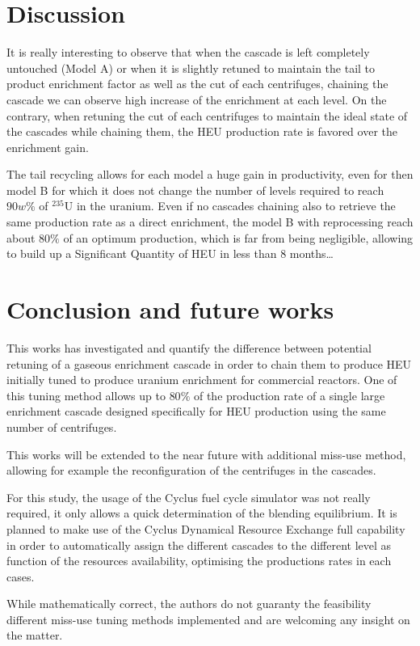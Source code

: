\section{Discussion}

It is really interesting to observe that when the cascade is left completely
untouched (Model A) or when it is slightly retuned to maintain the tail to
product enrichment factor as well as the cut of each centrifuges, chaining the
cascade we can observe high increase of the enrichment at each level.  On the
contrary, when retuning the cut of each centrifuges to maintain the ideal state
of the cascades while chaining them, the \gls{HEU} production rate is favored
over the enrichment gain.

The tail recycling allows for each model a huge gain in productivity, even for
then model B for which it does not change the number of levels required to reach
$90w\%$ of $^{235}$U in the uranium. Even if no cascades chaining also to
retrieve the same production rate as a direct enrichment, the model B with
reprocessing reach about $80\%$ of an optimum production, which is far from
being negligible, allowing to build up a Significant Quantity of \gls{HEU} in
less than 8 months\ldots


\section{Conclusion and future works}

This works has investigated and quantify the difference between potential
retuning of a gaseous enrichment cascade in order to chain them to produce
\gls{HEU} initially tuned to produce uranium enrichment for commercial reactors.
One of this tuning method allows up to $80\%$ of the production rate of a single
large enrichment cascade designed specifically for \gls{HEU} production using
the same number of centrifuges.

This works will be extended to the near future with additional miss-use method,
allowing for example the reconfiguration of the centrifuges in the cascades.

For this study, the usage of the Cyclus fuel cycle simulator was not really
required, it only allows a quick determination of the blending equilibrium. It
is planned to make use of the Cyclus Dynamical Resource Exchange full capability
in order to automatically assign the different cascades to the different level
as function of the resources availability, optimising the productions rates in
each cases.

While mathematically correct, the authors do not guaranty the feasibility
different miss-use tuning methods implemented and are welcoming any insight on
the matter.


